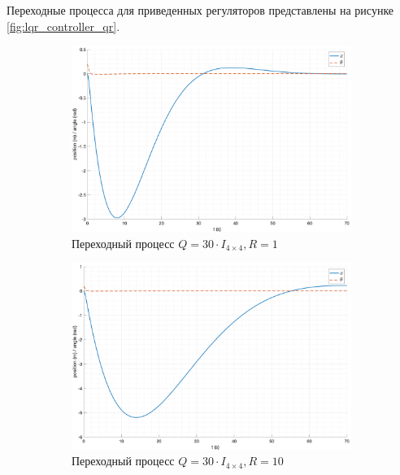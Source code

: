 Переходные процесса для приведенных регуляторов представлены на рисунке \ref{fig:lqr_controller_qr}.
\begin{figure}[ht!]
    \centering
    \begin{subfigure}[b]{0.45\textwidth}
        \centering
        \includegraphics[width=\textwidth]{media/plots/LQR/out_6.png}
        \caption{Переходный процесс $Q = 30 \cdot I_{4\times 4}, R = 1$}
    \end{subfigure}
    \begin{subfigure}[b]{0.45\textwidth}
        \centering
        \includegraphics[width=\textwidth]{media/plots/LQR/out_7.png}
        \caption{Переходный процесс $Q = 30 \cdot I_{4\times 4}, R = 10$}
    \end{subfigure}
    \begin{subfigure}[b]{0.45\textwidth}
        \centering

\end{subfigure}
\end{figure}
